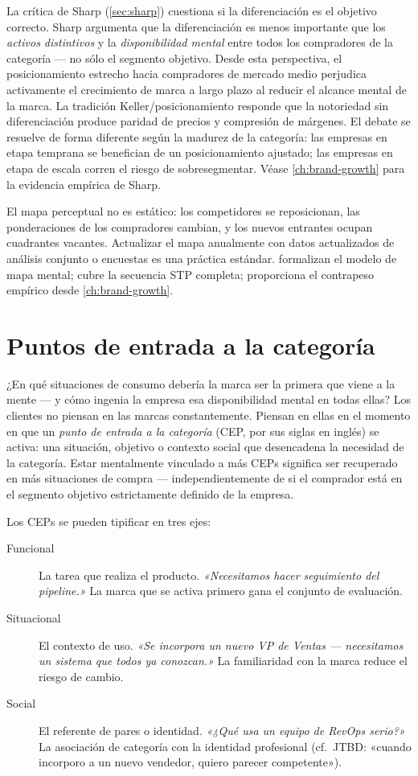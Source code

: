 La crítica de Sharp (\cref{sec:sharp}) cuestiona si la diferenciación es el objetivo correcto. Sharp argumenta que la diferenciación es menos importante que los \emph{activos distintivos} y la \emph{disponibilidad mental} entre todos los compradores de la categoría --- no sólo el segmento objetivo. Desde esta perspectiva, el posicionamiento estrecho hacia compradores de mercado medio perjudica activamente el crecimiento de marca a largo plazo al reducir el alcance mental de la marca. La tradición Keller/posicionamiento responde que la notoriedad sin diferenciación produce paridad de precios y compresión de márgenes. El debate se resuelve de forma diferente según la madurez de la categoría: las empresas en etapa temprana se benefician de un posicionamiento ajustado; las empresas en etapa de escala corren el riesgo de sobresegmentar. Véase \cref{ch:brand-growth} para la evidencia empírica de Sharp.

El mapa perceptual no es estático: los competidores se reposicionan, las ponderaciones de los compradores cambian, y los nuevos entrantes ocupan cuadrantes vacantes. Actualizar el mapa anualmente con datos actualizados de análisis conjunto o encuestas es una práctica estándar. \textcite{ries2001} formalizan el modelo de mapa mental; \textcite{kotler2021} cubre la secuencia STP completa; \textcite{sharp2010} proporciona el contrapeso empírico desde \cref{ch:brand-growth}.

\section{Puntos de entrada a la categoría}\label{sec:jtbd}

¿En qué situaciones de consumo debería la marca ser la primera que viene a la mente --- y cómo ingenia la empresa esa disponibilidad mental en todas ellas? Los clientes no piensan en las marcas constantemente. Piensan en ellas en el momento en que un \emph{punto de entrada a la categoría} (CEP, por sus siglas en inglés) se activa: una situación, objetivo o contexto social que desencadena la necesidad de la categoría. Estar mentalmente vinculado a más CEPs significa ser recuperado en más situaciones de compra --- independientemente de si el comprador está en el segmento objetivo estrictamente definido de la empresa.

Los CEPs se pueden tipificar en tres ejes:

\begin{description}
  \item[Funcional] La tarea que realiza el producto. \emph{«Necesitamos hacer seguimiento del pipeline.»} La marca que se activa primero gana el conjunto de evaluación.
  \item[Situacional] El contexto de uso. \emph{«Se incorpora un nuevo VP de Ventas --- necesitamos un sistema que todos ya conozcan.»} La familiaridad con la marca reduce el riesgo de cambio.
  \item[Social] El referente de pares o identidad. \emph{«¿Qué usa un equipo de RevOps serio?»} La asociación de categoría con la identidad profesional (cf.\ JTBD: «cuando incorporo a un nuevo vendedor, quiero parecer competente»).
\end{description}

